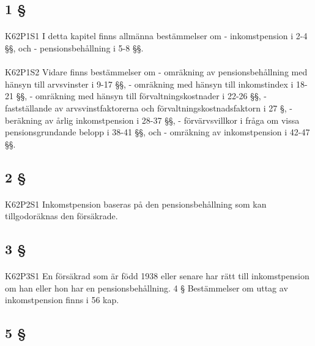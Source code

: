 \documentclass[a4paper,notitlepage,openany,10pt]{book}
\begin{document}
\subsection*{1 §}
\paragraph*{}
{\tiny K62P1S1}
I detta kapitel finns allmänna bestämmelser om
\newline - inkomstpension i 2-4 §§, och
\newline - pensionsbehållning i 5-8 §§.
\paragraph*{}
{\tiny K62P1S2}
Vidare finns bestämmelser om
\newline - omräkning av pensionsbehållning med hänsyn till arvsvinster i 9-17 §§,
\newline - omräkning med hänsyn till inkomstindex i 18-21 §§,
\newline - omräkning med hänsyn till förvaltningskostnader i 22-26 §§,
\newline - fastställande av arvsvinstfaktorerna och förvaltningskostnadsfaktorn i 27 §,
\newline - beräkning av årlig inkomstpension i 28-37 §§,
\newline - förvärvsvillkor i fråga om vissa pensionsgrundande belopp i 38-41 §§, och
\newline - omräkning av inkomstpension i 42-47 §§.
\subsection*{2 §}
\paragraph*{}
{\tiny K62P2S1}
Inkomstpension baseras på den pensionsbehållning som kan tillgodoräknas den försäkrade.
\subsection*{3 §}
\paragraph*{}
{\tiny K62P3S1}
En försäkrad som är född 1938 eller senare har rätt till inkomstpension om han eller hon har en pensionsbehållning. 4 § Bestämmelser om uttag av inkomstpension finns i 56 kap.
\subsection*{5 §}
\end{document}
